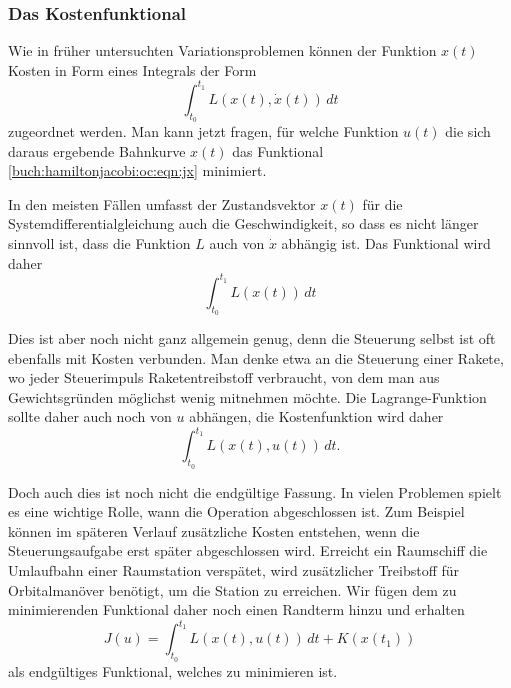 %
%
\subsubsection{Das Kostenfunktional}
Wie in früher untersuchten Variationsproblemen können der Funktion $x(t)$
Kosten in Form eines Integrals der Form
\begin{equation}
\int_{t_0}^{t_1}
L(x(t),\dot{x}(t))
\,dt
\label{buch:hamiltonjacobi:oc:eqn:jxdotx}
\end{equation}
zugeordnet werden.
Man kann jetzt fragen, für welche Funktion $u(t)$ die sich daraus
ergebende Bahnkurve $x(t)$ das Funktional
\eqref{buch:hamiltonjacobi:oc:eqn:jx}
minimiert.

In den meisten Fällen umfasst der Zustandsvektor $x(t)$ für die
Systemdifferentialgleichung auch die Geschwindigkeit, so dass
es nicht länger sinnvoll ist, dass die Funktion $L$ auch von
$\dot{x}$ abhängig ist.
Das Funktional wird daher
\begin{equation}
\int_{t_0}^{t_1}
L(x(t))
\,dt
\label{buch:hamiltonjacobi:oc:eqn:jx}
\end{equation}

Dies ist aber noch nicht ganz allgemein genug, denn die Steuerung selbst
ist oft ebenfalls mit Kosten verbunden.
Man denke etwa an die Steuerung einer Rakete, wo jeder Steuerimpuls 
Raketentreibstoff verbraucht, von dem man aus Gewichtsgründen möglichst
wenig mitnehmen möchte.
Die Lagrange-Funktion sollte daher auch noch von $u$ abhängen, die
Kostenfunktion wird daher
\begin{equation}
\int_{t_0}^{t_1}
L(x(t),u(t))
\,dt.
\end{equation}

Doch auch dies ist noch nicht die endgültige Fassung.
In vielen Problemen spielt es eine wichtige Rolle, wann die
Operation abgeschlossen ist.
Zum Beispiel können im späteren Verlauf zusätzliche Kosten entstehen,
wenn die Steuerungsaufgabe erst später abgeschlossen wird.
Erreicht ein Raumschiff die Umlaufbahn einer Raumstation verspätet,
wird zusätzlicher Treibstoff für Orbitalmanöver benötigt, um die Station
zu erreichen.
Wir fügen dem zu minimierenden Funktional daher noch einen Randterm
hinzu und erhalten
\begin{equation}
J(u)
=
\int_{t_0}^{t_1}
L(x(t),u(t))
\,dt
+
K(x(t_1))
\label{buch:hamiltonjacobi:oc:eqn:jk}
\end{equation}
als endgültiges Funktional, welches zu minimieren ist.

%
%
